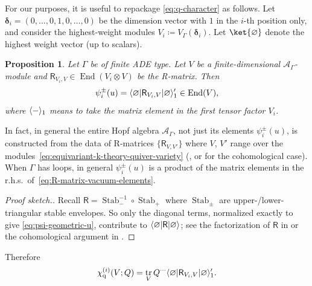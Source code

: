 \documentclass[pdftex]{sigma}%
\numberwithin{equation}{section}
\newtheorem{Proposition}[Theorem]{Proposition}
\renewcommand{\vec}[1]{\bm{#1}}
\newcommand{\kQ}{Q}
\newcommand{\scA}{\mathscr{A}}
\newcommand{\sR}{\mathsf{R}}
\newcommand{\chiq}{\chi_{\mathrm{q}}}
\DeclareMathOperator{\End}{End}
\DeclareMathOperator{\tr}{tr}
\DeclareMathOperator{\Stab}{Stab}
\DeclarePairedDelimiter{\inner}{\langle}{\rangle}
\begin{document}
\begin{MyParagraph}
For our purposes, it is useful to repackage \eqref{eq:q-character} as
follows. Let $\vec\delta_i = (0, \ldots, 0, 1, 0, \ldots, 0)$ be the
dimension vector with $1$ in the $i$-th position only, and consider
the highest-weight modules $V_i \coloneqq V_\Gamma(\vec\delta_i)$. Let
$\ket{\varnothing}$ denote the highest weight vector (up to scalars).

\begin{Proposition}
 Let $\Gamma$ be of finite ADE type. Let $V$ be a finite-dimensional
 $\scA_\Gamma$-module and $\sR_{V_i,V} \in \End(V_i \otimes V)$ be the
 R-matrix. Then
 \begin{equation} \label{eq:R-matrix-vacuum-elements}
 \psi_i^\pm(u) = \inner{\varnothing | \sR_{V_i,V} | \varnothing}_1' \in \End(V),
 \end{equation}
 where $\inner{-}_1$ means to take the matrix element in the first
 tensor factor $V_i$.
\end{Proposition}

In fact, in general the entire Hopf algebra $\scA_\Gamma$, not just
its elements $\psi_i^\pm(u)$, is constructed from the data of
R-matrices $\{\sR_{V,V'}\}$ where $V$, $V'$ range over the modules~\eqref{eq:equivariant-k-theory-quiver-variety} (\cite{Reshetikhin1989},
\cite[Section~3]{Okounkov2016}  or \cite[Section~5]{Maulik2019} for the
cohomological case). When $\Gamma$ has loops, in general
$\psi_i^\pm(u)$ is a product of the matrix elements in the r.h.s.\ of~\eqref{eq:R-matrix-vacuum-elements}.

\begin{proof}[Proof sketch.]
 Recall $\sR = \Stab_-^{-1} \circ \Stab_+$ where $\Stab_\pm$ are
 upper-/lower-triangular stable envelopes. So only the diagonal
 terms, normalized exactly to give \eqref{eq:psi-geometric-u},
 contribute to $\inner{\varnothing | \sR | \varnothing}$; see the
 factorization of $\sR$ in \cite[Section~2.3]{Okounkov2016} or the
 cohomological argument in \cite[Section~4.7]{Maulik2019}.
\end{proof}

Therefore
\begin{equation} \label{eq:q-character-as-vacuum-matrix-element}
 \chiq^{(i)}(V; \kQ) = \tr_V \kQ^{\cdots} \inner{\varnothing | \sR_{V_i,V} | \varnothing}_1'.
\end{equation}
\end{MyParagraph}
\end{document}
